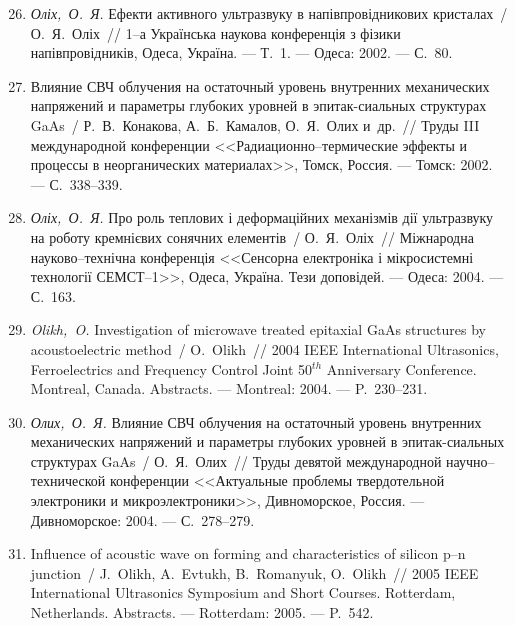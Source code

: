 \begin{enumerate}[label=\arabic*.,leftmargin=2em,itemindent=0cm]
\setcounter{enumi}{25}
\item
\emph{Оліх,~О.~Я.} Ефекти активного
  ультразвуку в напівпровідникових
  кристалах~/ О.~Я.~Оліх~// 1--а {У}країнська
  наукова конференція з фізики
  напівпровідників, {О}деса, {У}країна. ---
  Т.~1. ---
  Одеса: 2002. ---
  {С.}~80.

\item
Влияние {СВЧ} облучения на остаточный
  уровень внутренних механических
  напряжений и параметры глубоких уровней в
  эпитак-сиальных структурах {G}a{A}s~/
  Р.~В.~Конакова, А.~Б.~Камалов, О.~Я.~Олих
  {и~др.}~// Труды {III} международной
  конференции <<{Р}адиационно--термические
  эффекты и процессы в неорганических
  материалах>>, {Т}омск, {Р}оссия. ---
  Томск: 2002. ---
  {С.}~338--339.

\item
\emph{Оліх,~О.~Я.} Про роль теплових і
  деформаційних механізмів дії ультразвуку
  на роботу кремнієвих сонячних елементів~/
  О.~Я.~Оліх~// Міжнародна науково--технічна
  конференція <<{С}енсорна електроніка і
  мікросистемні технології {СЕМСТ}--1>>,
  {О}деса, {У}країна. Тези доповідей. ---
  Одеса: 2004. ---
  {С.}~163.

\item
\emph{Olikh,~O.} Investigation of microwave treated epitaxial {G}a{A}s
  structures by acoustoelectric method~/ O.~Olikh~// 2004 {IEEE}
  {I}nternational {U}ltrasonics, {F}erroelectrics and {F}requency {C}ontrol
  {J}oint 50$^{th}$ {A}nniversary {C}onference. Montreal, {C}anada. Abstracts.
  ---
  Montreal: 2004. ---
  P.~230--231.

\item
\emph{Олих,~О.~Я.} Влияние {СВЧ} облучения на
  остаточный уровень внутренних
  механических напряжений и параметры
  глубоких уровней в эпитак-сиальных
  структурах {G}a{A}s~/ О.~Я.~Олих~// Труды девятой
  международной научно--технической
  конференции <<{А}ктуальные проблемы
  твердотельной электроники и
  микроэлектроники>>, {Д}ивноморское,
  {Р}оссия. ---
  Дивноморское: 2004. ---
  {С.}~278--279.

\item
Influence of acoustic wave on forming and characteristics of silicon p--n
  junction~/ J.~Olikh, A.~Evtukh, B.~Romanyuk, O.~Olikh~// 2005 {IEEE}
  {I}nternational {U}ltrasonics {S}ymposium and {S}hort {C}ourses. Rotterdam,
  {N}etherlands. Abstracts. ---
  Rotterdam: 2005. ---
  P.~542.


\end{enumerate}
